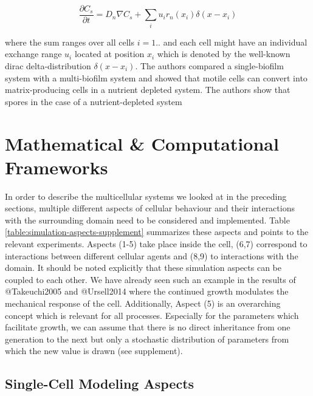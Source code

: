 \documentclass{article}
\begin{document}
\begin{equation}
    \frac{\partial C_s}{\partial t} = D_n \nabla C_s  + \sum\limits_i u_i r_n (x_i) \delta(x-x_i)
\end{equation}

where the sum ranges over all cells $i=1..$ and each cell might have an individual exchange range
$u_i$ located at position $x_i$ which is denoted by the well-known dirac delta-distribution
$\delta(x-x_i)$.
The authors compared a single-biofilm system with a multi-biofilm system and showed that
motile cells can convert into matrix-producing cells in a nutrient depleted system.
The authors show that spores in the case of a nutrient-depleted system

\section{Mathematical \& Computational Frameworks}

In order to describe the multicellular systems we looked at in the preceding sections, multiple
different aspects of cellular behaviour and their interactions with the surrounding domain need to
be considered and implemented.
Table \ref{table:simulation-aspects-supplement} summarizes these aspects and points to the relevant
experiments.
Aspects (1-5) take place inside the cell, (6,7) correspond to interactions between different
cellular agents and (8,9) to interactions with the domain.
It should be noted explicitly that these simulation aspects can be coupled to each other.
We have already seen such an example in the results of @Takeuchi2005 and @Ursell2014 where the
continued growth modulates the mechanical response of the cell.
Additionally, Aspect (5) is an overarching concept which is relevant for all processes.
Especially for the parameters which facilitate growth, we can assume that there is no direct
inheritance from one generation to the next but only a stochastic distribution of parameters from
which the new value is drawn (see supplement).

\subsection{Single-Cell Modeling Aspects}
\end{document}
